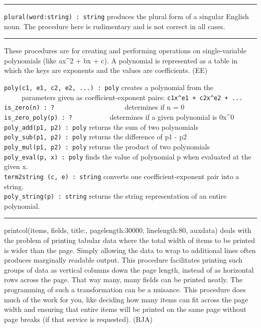 \vspace{0.25cm}\hrule{}

\texttt{plural(word:string) : string} produces the plural form of a singular English noun. The procedure here is
rudimentary and is not correct in all cases. 

\vspace{0.25cm}\hrule{}

These procedures are for creating and performing operations on
single-variable polynomials (like ax\^{}2 + bx + c).
A polynomial is represented as a table in which the keys are exponents
and the values are coefficients. (EE)

\texttt{poly(c1, e1, c2, e2, ...) : poly} creates a polynomial from
the\\
 \ \ \ \ \ parameters given as coefficient-exponent pairs:
\texttt{c1x\^{}e1 + c2x\^{}e2 + ...}\\
\texttt{is\_zero(n) : ?
\ }\ \ \ \ \ \ \ \ \ \ \ \ \ \ \ \ \ \ determines if n = 0\\
\texttt{is\_zero\_poly(p) : ?} \ \ \ \ \ \ \ \ \ \ determines if a given
polynomial is 0x\^{}0\\
\texttt{poly\_add(p1, p2) : poly} returns the sum of two
polynomials\\
\texttt{poly\_sub(p1, p2) : poly} returns the difference of p1 -
p2\\
\texttt{poly\_mul(p1, p2) : poly} returns the product of two
polynomials\\
\texttt{poly\_eval(p, x) : poly} finds the value of polynomial p when
evaluated at the given x.\\
\texttt{term2string (c, e) : string} converts one coefficient-exponent
pair into a string.\\
\texttt{poly\_string(p) : string} returns the string representation of
an entire polynomial. 

\vspace{0.25cm}\hrule{}

printcol(items, fields, title:{\textquotedbl}{\textquotedbl},
pagelength:30000, linelength:80, auxdata) deals with the problem of
printing tabular data where the total width of items to be printed is
wider than the page. Simply allowing the data to wrap to additional
lines often produces marginally readable output. This procedure
facilitates printing such groups of data as vertical columns down the
page length, instead of as horizontal rows across the page. That way
many, many fields can be printed neatly. The programming of such a
transformation can be a nuisance. This procedure does much of the work
for you, like deciding how many items can fit across the page width and
ensuring that entire items will be printed on the same page without
page breaks (if that service is requested). (RJA)

